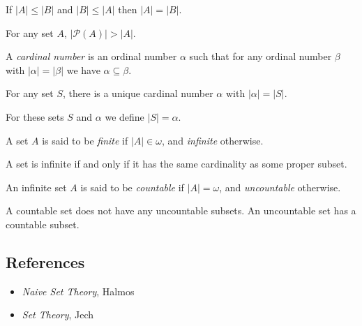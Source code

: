 \begin{thm}
  If $|A|\le|B|$ and $|B|\le|A|$ then $|A|=|B|$.
\end{thm}
\begin{thm}
  For any set $A$, $|\mathcal P(A)|>|A|$.
\end{thm}
\begin{defn}
  A \emph{cardinal number} is an ordinal number $\alpha$ such that for any
  ordinal number $\beta$ with $|\alpha|=|\beta|$ we have $\alpha\subseteq\beta$.
\end{defn}
\begin{prop}
  For any set $S$, there is a unique cardinal number $\alpha$ with
  $|\alpha|=|S|$.
\end{prop}
\begin{defn}
  For these sets $S$ and $\alpha$ we define $|S|=\alpha$.
\end{defn}
\begin{defn}
  A set $A$ is said to be \emph{finite} if $|A|\in\omega$, and \emph{infinite}
  otherwise.
\end{defn}
\begin{prop}
  A set is infinite if and only if it has the same cardinality as some proper
  subset.
\end{prop}
\begin{defn}
  An infinite set $A$ is said to be \emph{countable} if $|A|=\omega$, and
  \emph{uncountable} otherwise.
\end{defn}
\begin{prop}
  A countable set does not have any uncountable subsets. An uncountable set has
  a countable subset.
\end{prop}
\subsection*{References}
\begin{itemize}
  \item \emph{Naive Set Theory}, Halmos
  \item \emph{Set Theory}, Jech
\end{itemize}
